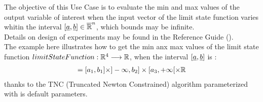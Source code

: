 \renewcommand{\filename}{docUC_MinMax_Evaluation2.tex}
\renewcommand{\filetitle}{UC : Min/Max research  with an optimization algorithm}

\HeaderIIILevel




The objective of this Use Case is to evaluate the min and max values of the output variable of interest when the input vector of the limit state function varies whitin the interval  $[{\underline{a}}, {\underline{b}}] \in \overline{{\mathbb R}}^n$, which bounds may be infinite. \\


Details on design of experiments  may be found in the Reference Guide ().\\



The example here illustrates how to get the min anx max values of the limit state function $limitStateFunction : {\mathbb R}^4 \longrightarrow {\mathbb R}$, when the interval  $[{\underline{a}}, {\underline{b}}] $ is :
\begin{align*}
  [\vect{a}, \vect{b}] = [a_1, b_1] \times ]-\infty, b_2] \times [a_3, +\infty[ \times \Rset
\end{align*}
thanks to the TNC (Truncated Newton Constrained) algorithm parameterized with is default parameters.\\




